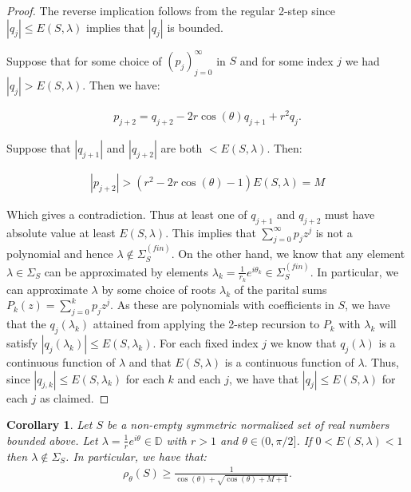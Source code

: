 \documentclass[11pt]{amsart}
\newtheorem{corollary}[theorem]{Corollary}
\numberwithin{theorem}{section} %
\numberwithin{corollary}{section}
\numberwithin{lemma}{section}
\numberwithin{proposition}{section}
\numberwithin{definition}{section}
\begin{document}
\begin{proof}
The reverse implication follows from the regular 2-step since $|q_j| \leqslant E(S, \lambda)$ implies that $|q_j|$ is bounded.

Suppose that for some choice of $(p_j)_{j=0}^\infty$ in $S$ and for some index $j$ we had $|q_j| > E(S, \lambda)$. Then we have:

\begin{align*}
p_{j+2} = q_{j+2} - 2r\cos(\theta)q_{j+1} + r^2q_j.
\end{align*}

Suppose that $|q_{j+1}|$ and $|q_{j+2}|$ are both $< E(S, \lambda)$. Then:

\begin{align*}
|p_{j+2}| > (r^2-2r\cos(\theta)-1)E(S, \lambda) = M
\end{align*}

Which gives a contradiction. Thus at least one of $q_{j+1}$ and $q_{j+2}$ must have absolute value at least $E(S, \lambda)$. This implies that $\sum_{j=0}^\infty p_jz^j$ is not a polynomial and hence $\lambda \notin \Sigma_{S}^{(fin)}$. On the other hand, we know that any element $\lambda \in \Sigma_S$ can be approximated by elements $\lambda_k = \frac{1}{r_k}e^{i\theta_k} \in \Sigma_{S}^{(fin)}$. In particular, we can approximate $\lambda$ by some choice of roots $\lambda_k$ of the parital sums $P_k(z) = \sum_{j=0}^k p_jz^j$. As these are polynomials with coefficients in $S$, we have that the $q_j(\lambda_k)$ attained from applying the 2-step recursion to $P_k$ with $\lambda_k$ will satisfy $|q_j(\lambda_k)| \leqslant E(S, \lambda_k)$. For each fixed index $j$ we know that $q_j(\lambda)$ is a continuous function of $\lambda$ and that $E(S, \lambda)$ is a continuous function of $\lambda$. Thus, since $|q_{j, k}| \leqslant E(S, \lambda_k)$ for each $k$ and each $j$, we have that $|q_j| \leqslant E(S, \lambda)$ for each $j$ as claimed.

\end{proof}

\begin{corollary}
Let $S$ be a non-empty symmetric normalized set of real numbers bounded above. Let $\lambda = \frac{1}{r}e^{i\theta} \in \mathbb{D}$ with $r > 1$ and $\theta \in (0, \pi/2]$. If $0 < E(S, \lambda) < 1$ then $\lambda \notin \Sigma_S$. In particular, we have that:
\begin{align*}
\rho_{\theta}(S) \geqslant \frac{1}{\cos(\theta) + \sqrt{\cos(\theta) + M + 1}}.
\end{align*}
\end{corollary}
\end{document}
